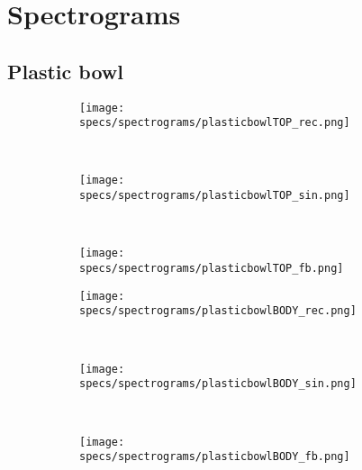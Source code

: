 \chapter{Spectrograms}\label{ap:spectrograms}
\section*{Plastic bowl}

\begin{figure}[H]
    \centering
    \begin{subfigure}[b]{0.25\textwidth}
        \texttt{[image: specs/spectrograms/plasticbowlTOP\_rec.png]}
    \end{subfigure}%
    ~ %
    \begin{subfigure}[b]{0.25\textwidth}
        \texttt{[image: specs/spectrograms/plasticbowlTOP\_sin.png]}
    \end{subfigure}%
    ~ %
    \begin{subfigure}[b]{0.25\textwidth}
        \texttt{[image: specs/spectrograms/plasticbowlTOP\_fb.png]}
    \end{subfigure}%
      
    \begin{subfigure}[b]{0.25\textwidth}
        \texttt{[image: specs/spectrograms/plasticbowlBODY\_rec.png]}
    \end{subfigure}%
    ~ %
    \begin{subfigure}[b]{0.25\textwidth}
        \texttt{[image: specs/spectrograms/plasticbowlBODY\_sin.png]}
    \end{subfigure}%
    ~ %
    \begin{subfigure}[b]{0.25\textwidth}
        \texttt{[image: specs/spectrograms/plasticbowlBODY\_fb.png]}
    \end{subfigure}%
      

\end{figure}
